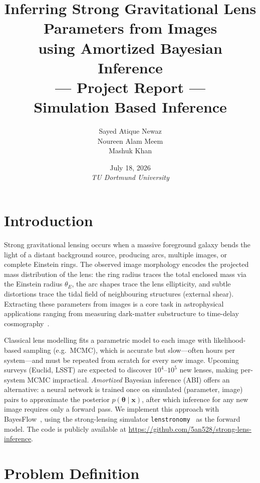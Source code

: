 \documentclass[11pt,a4paper]{article}
\title{Inferring Strong Gravitational Lens Parameters from Images\\
       using Amortized Bayesian Inference\\[1.2em]
       \large --- Project Report ---\\
       Simulation Based Inference}
\author{Sayed Atique Newaz\\ Noureen Alam Meem\\ Mashuk Khan}
\date{July 18, 2026\\[0.6em] \textit{TU Dortmund University}}
\begin{document}
\maketitle
\thispagestyle{empty}
\newpage

\tableofcontents
\newpage

\section{Introduction}

Strong gravitational lensing occurs when a massive foreground galaxy bends the light
of a distant background source, producing arcs, multiple images, or complete Einstein
rings. The observed image morphology encodes the projected mass distribution of the
lens: the ring radius traces the total enclosed mass via the Einstein radius
$\theta_E$, the arc shapes trace the lens ellipticity, and subtle distortions trace
the tidal field of neighbouring structures (external shear). Extracting these
parameters from images is a core task in astrophysical applications ranging from
measuring dark-matter substructure to time-delay
cosmography~\cite{schneider2013msd}.

Classical lens modelling fits a parametric model to each image with likelihood-based
sampling (e.g.\ MCMC), which is accurate but slow---often hours per system---and must
be repeated from scratch for every new image. Upcoming surveys (Euclid, LSST) are
expected to discover $10^4$--$10^5$ new lenses, making per-system MCMC impractical.
\emph{Amortized} Bayesian inference (ABI) offers an alternative: a neural network is
trained once on simulated (parameter, image) pairs to approximate the posterior
$p(\boldsymbol\theta \mid \mathbf{x})$, after which inference for any new image
requires only a forward pass. We implement this approach with
BayesFlow~\cite{radev2020bayesflow,bayesflow2023software}, using the strong-lensing
simulator \texttt{lenstronomy}~\cite{birrer2018lenstronomy} as the forward model.
The code is publicly available at
\url{https://github.com/5an528/strong-lens-inference}.

\section{Problem Definition}
\end{document}
